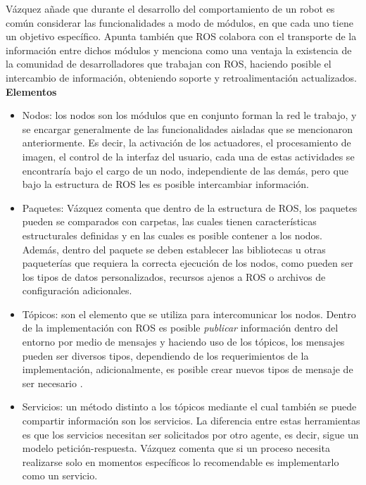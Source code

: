            Vázquez añade que durante el desarrollo del comportamiento de un robot es común considerar las funcionalidades a modo de módulos, en que cada uno tiene un objetivo específico. Apunta también que ROS colabora con el transporte de la información entre dichos módulos y menciona como una ventaja la existencia de la comunidad de desarrolladores que trabajan con ROS, haciendo posible el intercambio de información, obteniendo soporte y retroalimentación actualizados.
            \phantom{saltodelineaforzado >:D}\\

            \textbf{Elementos}
            \begin{itemize}
                \item Nodos: los nodos son los módulos que en conjunto forman la red le trabajo, y se encargar generalmente de las funcionalidades aisladas que se mencionaron anteriormente. Es decir, la activación de los actuadores, el procesamiento de imagen, el control de la interfaz del usuario, cada una de estas actividades se encontraría bajo el cargo de un nodo, independiente de las demás, pero que bajo la estructura de ROS les es posible intercambiar información.
                \item Paquetes: Vázquez comenta que dentro de la estructura de ROS, los paquetes pueden se comparados con carpetas, las cuales tienen características estructurales definidas y en las cuales es posible contener a los nodos. Además, dentro del paquete se deben establecer las bibliotecas u otras paqueterías que requiera la correcta ejecución de los nodos, como pueden ser los tipos de datos personalizados, recursos ajenos a ROS o archivos de configuración adicionales. 
                \item Tópicos: son el elemento que se utiliza para intercomunicar los nodos. Dentro de la implementación con ROS es posible \textit{publicar} información dentro del entorno por medio de mensajes y haciendo uso de los tópicos, los mensajes pueden ser diversos tipos, dependiendo de los requerimientos de la implementación, adicionalmente, es posible crear nuevos tipos de mensaje de ser necesario \cite{ros_wiki_std_msgs}. 
                \item Servicios: un método distinto a los tópicos mediante el cual también se puede compartir información son los servicios. La diferencia entre estas herramientas es que los servicios necesitan ser solicitados por otro agente, es decir, sigue un modelo petición-respuesta. Vázquez comenta que si un proceso necesita realizarse solo en momentos específicos lo recomendable es implementarlo como un servicio.
            \end{itemize}

